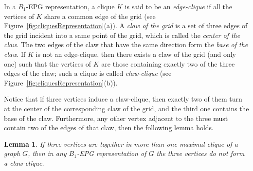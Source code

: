 \documentclass[9pt]{entcs}
\newtheorem{lema}[thm]{Lemma}%
\begin{document}
In  a $B_1$-EPG representation, a clique $K$  is said to be
 an \textit{edge-clique} if all the vertices of $K$ share a common edge of the grid (see Figure~\ref{fig:cliquesRepresentation}(a)).
 A \textit{claw of the grid} is a set of three edges of the grid incident into a same point of the grid, which is called
  the \textit{center of the claw}. The two edges of the claw that have the same direction form
    the \textit{ base of the claw}. If $K$ is not an edge-clique, then there exists
    a claw of the grid (and only one) such that the vertices of $K$ are those containing exactly two of the three edges of the claw; such a  clique is called  \textit{claw-clique} \cite{golumbic2009} (see Figure~\ref{fig:cliquesRepresentation}(b)).%

    
    

Notice that if three vertices induce a claw-clique, then exactly two of them turn at the center of the corresponding  claw of the grid, and the third one contains the
base of the claw. 
Furthermore, any other vertex  adjacent to the three  must contain two of the edges of that claw, then the following lemma holds.

\begin{lema}\label{lem:cliquesMaximais}
If three vertices are together  in more than one maximal clique of a graph $G$, then in
any $B_1$-EPG representation of $G$ the three vertices do not form a claw-clique. %
\end{lema}

\end{document}
